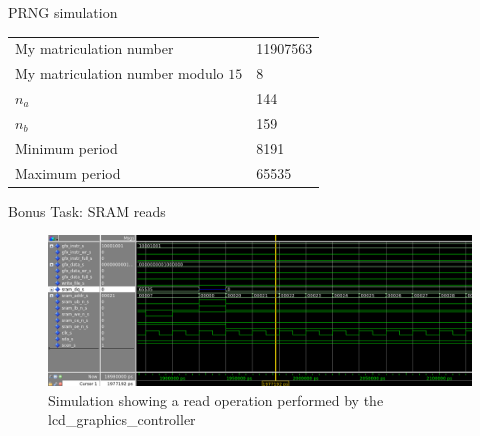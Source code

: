 \documentclass[10pt,a4paper,titlepage,oneside]{article}
\begin{document}
\begin{qa}{PRNG simulation}

\begin{center}
\begin{tabular}{ll}
\hline\hline
My matriculation number             & 11907563 \\
My matriculation number modulo $15$ & 8 \\
$n_a$                               & 144 \\
$n_b$                               & 159 \\
Minimum period                      & 8191 \\
Maximum period                      & 65535 \\\hline
\end{tabular}
\end{center}

\end{qa}

\begin{qa}{Bonus Task: SRAM reads}
\begin{figure}[h!]
	\centering
	\includegraphics[width=1.0\linewidth]{dia/Subtask8.png}
	\caption{Simulation showing a read operation performed by the \textsf{lcd\_graphics\_controller}}
\end{figure}
\end{qa}



\end{document}
